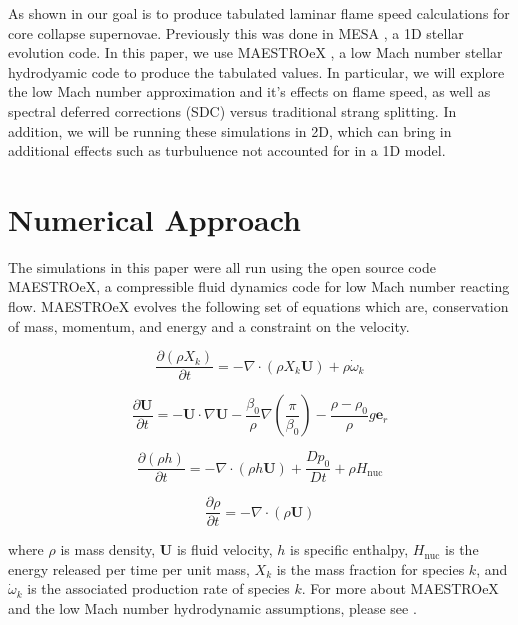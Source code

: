 \documentclass[preprint,times,tighten]{aastex63}
\begin{document}
As shown in \cite{Schwab_2020} our goal is to produce tabulated laminar flame speed calculations for core collapse supernovae. Previously this was done in MESA \citep{MESA}, a 1D stellar evolution code. In this paper, we use MAESTROeX \citep{MAESTROeX}, a low Mach number stellar hydrodyamic code to produce the tabulated values. In particular, we will explore the low Mach number approximation and it's effects on flame speed, as well as spectral deferred corrections (SDC) versus traditional strang splitting. In addition, we will be running these simulations in 2D, which can bring in additional effects such as turbuluence not accounted for in a 1D model.

\section{Numerical Approach}\label{Sec:numerics}
The simulations in this paper were all run using the open source code MAESTROeX, a compressible fluid dynamics code for low Mach number reacting flow. MAESTROeX evolves the following set of equations which are, conservation of mass, momentum, and energy and a constraint on the velocity.

\begin{equation}
  \frac{\partial\left(\rho X_{k}\right)}{\partial t}=-\nabla \cdot\left(\rho X_{k} \mathbf{U}\right)+\rho \dot{\omega}_{k}
\end{equation}

\begin{equation}
  \frac{\partial \mathbf{U}}{\partial t}=-\mathbf{U} \cdot \nabla \mathbf{U}-\frac{\beta_{0}}{\rho} \nabla\left(\frac{\pi}{\beta_{0}}\right)-\frac{\rho-\rho_{0}}{\rho} g \mathbf{e}_{r}
\end{equation}

\begin{equation}
  \frac{\partial(\rho h)}{\partial t}=-\nabla \cdot(\rho h \mathbf{U})+\frac{D p_{0}}{D t}+\rho H_{\mathrm{nuc}}
\end{equation}

\begin{equation}
  \frac{\partial \rho}{\partial t}=-\nabla \cdot(\rho \mathbf{U})
\end{equation}

where $\rho$ is mass density, $\mathbf{U}$ is fluid velocity, $h$ is specific enthalpy, $H_{\mathrm{nuc}}$ is the energy released per time per unit mass, $X_k$ is the mass fraction for species $k$, and $\dot{\omega}_{k}$ is the associated production rate of species $k$. For more about MAESTROeX and the low Mach number hydrodynamic assumptions, please see \cite{MAESTROeX}.
\end{document}
